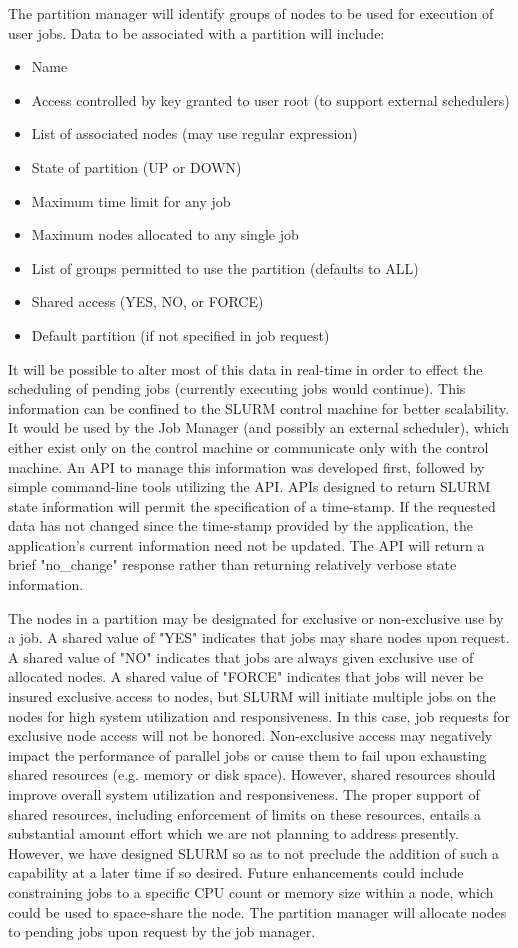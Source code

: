 The partition manager will identify groups of nodes to be used for
execution of user jobs. Data to be associated with a partition will include:
\begin{itemize}
\item Name
\item Access controlled by key granted to user root (to support external schedulers)
\item List of associated nodes (may use regular expression)
\item State of partition (UP or DOWN)
\item Maximum time limit for any job
\item Maximum nodes allocated to any single job
\item List of groups permitted to use the partition (defaults to ALL)
\item Shared access (YES, NO, or FORCE)
\item Default partition (if not specified in job request)
\end{itemize}

It will be possible to alter most of this data in real-time in order to 
effect the scheduling of pending jobs (currently executing jobs would continue). 
This information can be confined to the SLURM control machine for better scalability. 
It would be used
by the Job Manager (and possibly an external scheduler), which either exist only 
on the control machine or communicate only with the control machine. An API to 
manage this information was developed first, followed by simple command-line 
tools utilizing the API. 
APIs designed to return SLURM state information will permit the specification 
of a time-stamp. 
If the requested data has not changed since the time-stamp provided by the 
application, the application's current information need not be updated. 
The API will return a brief "no\_change" response rather than returning 
relatively verbose state information.

The nodes in a partition may be designated for exclusive or non-exclusive 
use by a job.
A shared value of "YES" indicates that jobs may share nodes upon request.
A shared value of "NO" indicates that jobs are always given exclusive use 
of allocated nodes.
A shared value of "FORCE" indicates that jobs will never be insured exclusive 
access to nodes, but SLURM will initiate multiple jobs on the nodes 
for high system utilization and responsiveness. 
In this case, job requests for exclusive node access will not be honored.
Non-exclusive access may negatively impact the performance of parallel jobs 
or cause them to fail upon exhausting shared resources (e.g. memory or disk 
space). However, shared resources should improve overall system utilization 
and responsiveness. The proper support of shared resources, including 
enforcement of limits on these resources, entails a substantial amount 
effort which we are not planning to address presently. 
However, we have designed SLURM so as to not preclude the addition of 
such a capability at a later time if so desired.
Future enhancements could include constraining jobs to a specific CPU count 
or memory size within a node, which could be used to space-share the node.
The partition manager will allocate nodes to pending jobs upon request by 
the job manager. 

